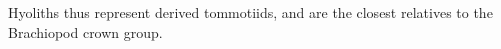 \documentclass[]{book}
\theoremstyle{definition}
\theoremstyle{definition}
\theoremstyle{definition}
\theoremstyle{remark}
\begin{document}
\begin{description}
Hyoliths thus represent derived tommotiids, and are the closest
relatives to the Brachiopod crown group.
\end{description}


\end{document}
